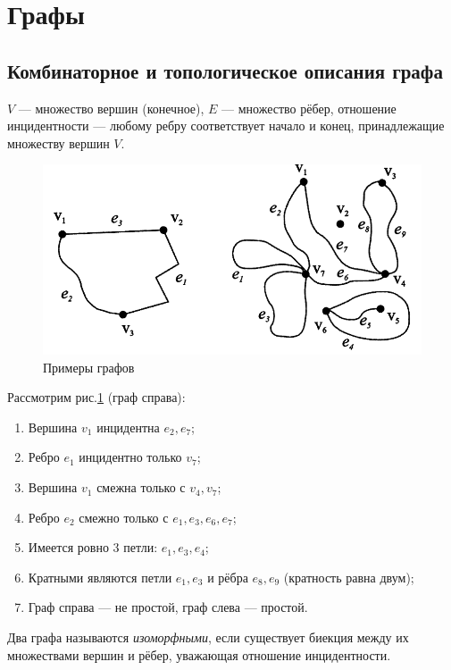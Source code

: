 \section{Графы}

\subsection{Комбинаторное и топологическое описания графа}
\begin{definition}
    $V$ — множество вершин (конечное), $E$ — множество рёбер, отношение инцидентности — любому ребру соответствует начало и конец, принадлежащие множеству вершин $V$.
\end{definition}

\begin{figure}[h]
    \centering
    \includegraphics[scale=0.7]{images/c3.1.2.png}
    \caption{Примеры графов}
    \label{fig:c3.1}
\end{figure}

Рассмотрим рис.\ref{fig:c3.1} (граф справа):
\begin{enumerate}
    \item Вершина $v_1$ инцидентна $e_2, e_7$;
    \item Ребро $e_1$ инцидентно только $v_7$;
    \item Вершина $v_1$ смежна только с $v_4, v_7$;
    \item Ребро $e_2$ смежно только с $e_1, e_3, e_6, e_7$;
    \item Имеется ровно 3 петли: $e_1, e_3, e_4$;
    \item Кратными являются петли $e_1, e_3$ и рёбра $e_8, e_9$ (кратность равна двум);
    \item Граф справа — не простой, граф слева — простой.
\end{enumerate}

\begin{definition}
    Два графа называются \textit{изоморфными}, если существует биекция между их множествами вершин и рёбер, уважающая отношение инцидентности.
\end{definition}

